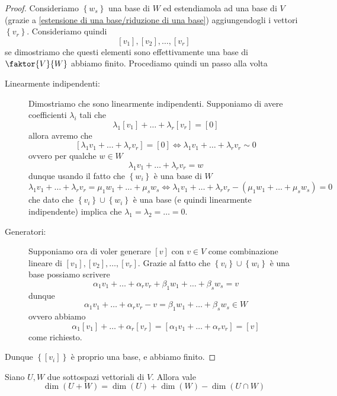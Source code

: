 \documentclass[11pt]{scrartcl}
\begin{document}
	\begin{proof}
		Consideriamo $\left\{w_s\right\}$ una base di $W$ ed estendiamola ad una base di $V$ (grazie a \ref{estensione di una base/riduzione di una base}) aggiungendogli i vettori $\left\{v_r\right\}$. Consideriamo quindi 
		$$[v_1],[v_2],\dots,[v_r]$$
		se dimostriamo che questi elementi sono effettivamente una base di $\faktor{V}{W}$ abbiamo finito. Procediamo quindi un passo alla volta
		\begin{description}
			\item[Linearmente indipendenti:] Dimostriamo che sono linearmente indipendenti. Supponiamo di avere coefficienti $\lambda_i$ tali che
			$$\lambda_1[v_1]+\dots+\lambda_r[v_r]=[0]$$
			allora avremo che 
			$$[\lambda_1v_1+\dots+\lambda_r v_r]=[0]\iff \lambda_1v_1+\dots+\lambda_r v_r\sim 0$$
			ovvero per qualche $w\in W$
			$$\lambda_1v_1+\dots+\lambda_r v_r=w$$
			dunque usando il fatto che $\left\{w_i\right\}$ è una base di $W$
			$$\lambda_1v_1+\dots+\lambda_r v_r=\mu_1w_1+\dots+\mu_sw_s\iff \lambda_1v_1+\dots+\lambda_r v_r-(\mu_1w_1+\dots+\mu_sw_s)=0$$
			che dato che $\left\{v_i\right\}\cup\left\{w_i\right\}$ è una base (e quindi linearmente indipendente) implica che $\lambda_1=\lambda_2=\dots=0$.
			\item[Generatori:] Supponiamo ora di voler generare $[v]$ con $v\in V$ come combinazione lineare di $[v_1],[v_2],\dots,[v_r]$. Grazie al fatto che $\left\{v_i\right\}\cup\left\{w_i\right\}$ è una base possiamo scrivere
			$$\alpha_1v_1+\dots+\alpha_rv_r+\beta_1w_1+\dots+\beta_sw_s=v$$
			dunque 
			$$\alpha_1v_1+\dots+\alpha_rv_r-v=\beta_1w_1+\dots+\beta_sw_s\in W$$
			ovvero abbiamo
			$$\alpha_1[v_1]+\dots+\alpha_r[v_r]=[\alpha_1v_1+\dots+\alpha_rv_r]=[v]$$
			come richiesto.
		\end{description}
		Dunque $\left\{\left[v_i\right]\right\}$ è proprio una base, e abbiamo finito.
	\end{proof}
	\begin{theorem}
		Siano $U,W$ due sottospazi vettoriali di $V$. Allora vale
		$$\dim(U+W)=\dim(U)+\dim(W)-\dim(U\cap W)$$
	\end{theorem}
\end{document}
